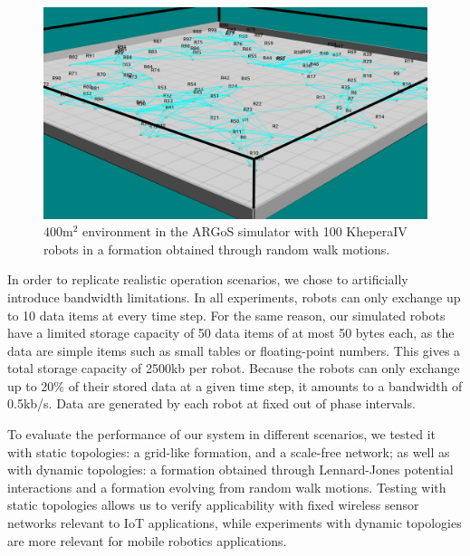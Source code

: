 \documentclass[sigconf]{aamas}
\begin{document}
\begin{figure}[h]
	\centering
    \includegraphics[width=0.90\columnwidth]{figures/argos_random.png}
    \caption{$400 \text{m}^2$ environment in the ARGoS simulator with 100 KheperaIV robots in a formation obtained through random walk motions.}
    \label{argos}
\end{figure}

In order to replicate realistic operation scenarios, we chose to artificially introduce bandwidth limitations. In all experiments, robots can only exchange up to 10 data items at every time step. For the same reason, our simulated robots have a limited storage capacity of 50 data items of at most 50 bytes each, as the data are simple items such as small tables or floating-point numbers. This gives a total storage capacity of 2500kb per robot. Because the robots can only exchange up to 20\% of their stored data at a given time step, it amounts to a bandwidth of 0.5kb/s. Data are generated by each robot at fixed out of phase intervals. 

To evaluate the performance of our system in different scenarios, we tested it with static topologies: a grid-like formation, and a scale-free network; as well as with dynamic topologies: a formation obtained through Lennard-Jones potential interactions and a formation evolving from random walk motions. Testing with static topologies allows us to verify applicability with fixed wireless sensor networks relevant to IoT applications, while experiments with dynamic topologies are more relevant for mobile robotics applications.
\end{document}
